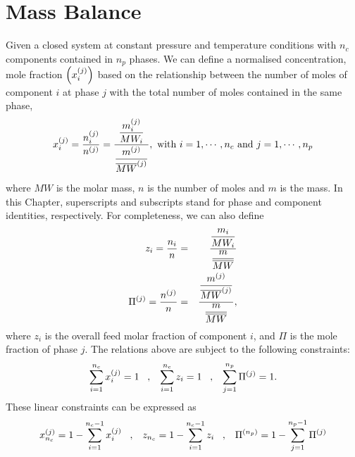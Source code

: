 \section{Mass Balance}\label{Chapter:ThermodynamicFormulation:Section:MassBalance}
Given a closed system at constant pressure and temperature conditions with $n_{c}$ components contained in $n_{p}$ phases. We can define a normalised concentration, \ie mole fraction $\left(\mfr[x]{i}{j}\right)$ based on the relationship between the number of moles of component $i$ at phase $j$ with the total number of moles contained in the same phase, 
\begin{equation}
    \mfr[x]{i}{j} = \frc{\mfr[n]{i}{j}}{\mfr[n]{}{j}} = \frc{\frc{\mfr[m]{i}{j}}{MW_{i}}}{\frc{\mfr[m]{}{j}}{\mfr[\overline{MW}]{}{j}}}, \hfill \text{ with } i=1, \cdots, n_{c} \text{ and } j=1, \cdots, n_{p}
\label{Chapter:ThermodynamicFormulation:Eqn:MoleFractionDef}
\end{equation}
where $MW$ is the molar mass, $n$ is the number of moles and $m$ is the mass. In this Chapter, superscripts and subscripts stand for phase and component identities, respectively.  For completeness, we can also define
\begin{eqnarray}
    z_{i} = \frc{n_{i}}{n} &=& \frc{\frc{m_{i}}{MW_{i}}}{\frc{m}{\overline{MW}}}\label{Chapter:ThermodynamicFormulation:Eqn:FeedFractionDef} \\
    \mfr[\Pi]{}{j} = \frc{\mfr[n]{}{j}}{n} &=& \frc{\frc{\mfr[m]{}{j}}{\mfr[\overline{MW}]{}{j}}}{\frc{m}{\overline{MW}}},\label{Chapter:ThermodynamicFormulation:Eqn:PhaseFractionDef} 
\end{eqnarray}
where $z_{i}$ is the overall feed molar fraction of component $i$, and $\Pi$ is the mole fraction of phase $j$. The relations above are subject to the following constraints:
\begin{equation}
    \summation_{i=1}^{n_{c}}\mfr[x]{i}{j} = 1 \;\;\;,\;\;\; \summation_{i=1}^{n_{c}}z_{i} = 1 \;\;\;,\;\;\; \summation_{j=1}^{n_{p}}\mfr[\Pi]{}{j} = 1. \label{Chapter:ThermodynamicFormulation:Eqn:FractionConstraints1}
\end{equation}
These linear constraints can be expressed as
\begin{equation}
    \mfr[x]{n_{c}}{j}= 1 - \summation_{i=1}^{n_{c}-1}\mfr[x]{i}{j} \;\;\;,\;\;\; z_{n_{c}}= 1 - \summation_{i=1}^{n_{c}-1}z_{i} \;\;\;,\;\;\; \mfr[\Pi]{}{n_{p}} = 1 - \summation_{j=1}^{n_{p}-1}\mfr[\Pi]{}{j} \label{Chapter:ThermodynamicFormulation:Eqn:FractionConstraints2}
\end{equation}
